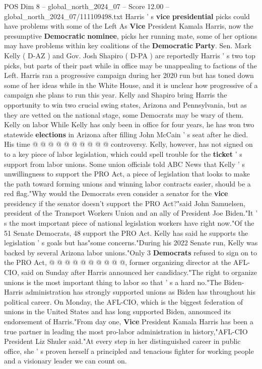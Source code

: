 \begin{textsample}{POS Dim 8 – global\_north\_2024\_07 – Score 12.00 – global\_north\_2024\_07/111109498.txt}  \label{ex:f8_pos_045}
Harris ' s \textbf{vice} \textbf{presidential} picks could have problems with some of the Left As \textbf{Vice} President Kamala Harris, now the presumptive \textbf{Democratic} \textbf{nominee}, picks her running mate, some of her options may have problems within key coalitions of the \textbf{Democratic} \textbf{Party}.
Sen.
Mark Kelly ( D-AZ ) and Gov.
Josh Shapiro ( D-PA ) are reportedly Harris ' s two top picks, but parts of their past while in office may be unappealing to factions of the Left.
Harris ran a progressive campaign during her 2020 run but has toned down some of her ideas while in the White House, and it is unclear how progressive of a campaign she plans to run this year.
Kelly and Shapiro bring Harris the opportunity to win two crucial swing states, Arizona and Pennsylvania, but as they are vetted on the national stage, some Democrats may be wary of them.
Kelly on labor While Kelly has only been in office for four years, he has won two statewide \textbf{elections} in Arizona after filling John McCain ' s seat after he died.
His time @ @ @ @ @ @ @ @ @ @ controversy.
Kelly, however, has not signed on to a key piece of labor legislation, which could spell trouble for the \textbf{ticket} ' s support from labor unions.
Some union officials told ABC News that Kelly ' s unwillingness to support the PRO Act, a piece of legislation that looks to make the path toward forming unions and winning labor contracts easier, should be a red flag."Why would the Democrats even consider a senator for the \textbf{vice} presidency if the senator doesn't support the PRO Act?"said John Samuelsen, president of the Transport Workers Union and an ally of President Joe Biden."It ' s the most important piece of national legislation workers have right now."Of the 51 Senate Democrats, 48 support the PRO Act.
Kelly has said he supports the legislation ' s goals but has"some concerns."During his 2022 Senate run, Kelly was backed by several Arizona labor unions."Only 3 \textbf{Democrats} refused to sign on to the PRO Act, @ @ @ @ @ @ @ @ @ @, former organizing director at the AFL-CIO, said on Sunday after Harris announced her candidacy."The right to organize unions is the most important thing to labor so that ' s a hard no."The Biden-Harris administration has strongly supported unions as Biden has throughout his political career.
On Monday, the AFL-CIO, which is the biggest federation of unions in the United States and has long supported Biden, announced its endorsement of Harris."From day one, \textbf{Vice} President Kamala Harris has been a true partner in leading the most pro-labor administration in history,"AFL-CIO President Liz Shuler said."At every step in her distinguished career in public office, she ' s proven herself a principled and tenacious fighter for working people and a visionary leader we can count on.

\end{textsample}

